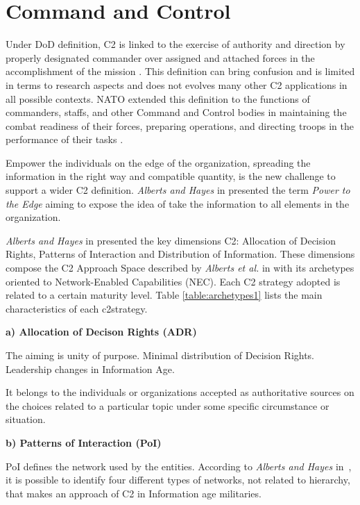\section{Command and Control}

Under DoD definition, C2 is linked to the exercise of authority and direction by properly designated commander over assigned and attached forces in the accomplishment of the mission \cite{}. This definition can bring confusion and is limited in terms to research aspects and does not evolves many other C2 applications in all possible contexts. NATO extended this definition to the functions of commanders, staffs, and other Command and Control bodies in maintaining the combat readiness of their forces, preparing operations, and directing troops in the performance of their tasks \cite{FRANCE2014}.

Empower the individuals on the edge of the organization, spreading the information in the right way and compatible quantity, is the new challenge to support a wider C2 definition. \textit{Alberts and Hayes} in \cite{Power01} presented the term \textit{Power to the Edge} aiming to expose the idea of take the information to all elements in the organization. 

\textit{Alberts and Hayes} in \cite{Power01} presented the key dimensions C2: Allocation of Decision Rights, Patterns of Interaction and Distribution of Information. These dimensions compose the C2 Approach Space described by \textit{Alberts et al.} in \cite{Alberts2006} with its archetypes oriented to Network-Enabled Capabilities (NEC). Each C2 strategy adopted is related to a certain maturity level. Table \ref{table:archetypes1} lists the main characteristics of each \gls{c2strategy}.



\textbf{a) Allocation of Decison Rights (ADR)}

The aiming is unity of purpose. Minimal distribution of Decision Rights.
Leadership changes in Information Age.

It belongs to the individuals or organizations accepted as authoritative sources on the choices related to a particular topic under some specific circumstance or situation.




\textbf{b) Patterns of Interaction (PoI)}

PoI defines the network used by the entities. According to \textit{Alberts and Hayes} in~\cite{Alberts2006}, it is possible to identify four different types of networks, not related to hierarchy, that makes an approach of C2 in Information age militaries.

